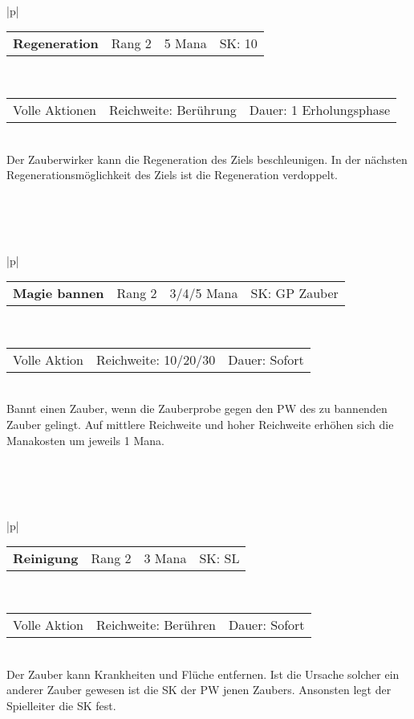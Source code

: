 \documentclass[../../Heldenanleitung2]{subfiles}
\begin{document}
\\\\\\
\begin{tabular}{|p{\textwidth}|}
\hline
\begin{tabularx}{\textwidth}{X|X|X|X}
\textbf{Regeneration} & Rang 2 & 5 Mana & SK: 10
\end{tabularx} \\ \hline
\begin{tabularx}{\textwidth}{X|X|X}
Volle Aktionen & Reichweite: Berührung & Dauer: 1 Erholungsphase
\end{tabularx} \\ \hline
Der Zauberwirker kann die Regeneration des Ziels beschleunigen. In der nächsten Regenerationsmöglichkeit des Ziels ist die Regeneration verdoppelt.
\\ \hline
\end{tabular}
\\\\\\
\begin{tabular}{|p{\textwidth}|}
\hline
\begin{tabularx}{\textwidth}{X|X|X|X}
\textbf{Magie bannen} & Rang 2 & 3/4/5 Mana & SK: GP Zauber
\end{tabularx} \\ \hline
\begin{tabularx}{\textwidth}{X|X|X}
Volle Aktion & Reichweite: 10/20/30 & Dauer: Sofort
\end{tabularx} \\ \hline
Bannt einen Zauber, wenn die Zauberprobe gegen den PW des zu bannenden Zauber gelingt. Auf mittlere Reichweite und hoher Reichweite erhöhen sich die Manakosten um jeweils 1 Mana.
\\ \hline
\end{tabular}
\\\\\\
\begin{tabular}{|p{\textwidth}|}
\hline
\begin{tabularx}{\textwidth}{X|X|X|X}
\textbf{Reinigung} & Rang 2 & 3 Mana & SK: SL
\end{tabularx} \\ \hline
\begin{tabularx}{\textwidth}{X|X|X}
Volle Aktion & Reichweite: Berühren & Dauer: Sofort
\end{tabularx} \\ \hline
Der Zauber kann Krankheiten und Flüche entfernen. Ist die Ursache solcher ein anderer Zauber gewesen ist die SK der PW jenen Zaubers. Ansonsten legt der Spielleiter die SK fest.
\\ \hline
\end{tabular}
\end{document}
